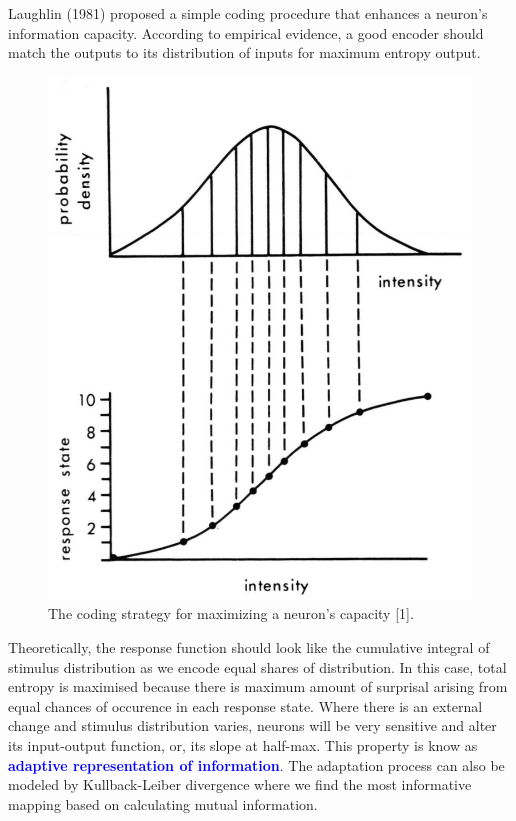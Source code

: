 \documentclass[11pt]{article}
\begin{document}
Laughlin (1981) proposed a simple coding procedure that enhances a neuron's information capacity. According to empirical evidence, a good encoder should match the outputs to its distribution of inputs for maximum entropy output.
\begin{figure}[H]
    \centering
    \includegraphics[scale=0.6]{imgs/efficientcoding.png}
    \caption{The coding strategy for maximizing a neuron's capacity [1].}
\end{figure}
Theoretically, the response function should look like the cumulative integral of stimulus distribution as we encode equal shares of distribution. In this case, total entropy is maximised because there is maximum amount of surprisal arising from equal chances of occurence in each response state. Where there is an external change and stimulus distribution varies, neurons will be very sensitive and alter its input-output function, or, its slope at half-max. This property is know as \textcolor{Blue}{\textbf{adaptive representation of information}}. The adaptation process can also be modeled by Kullback-Leiber divergence where we find the most informative mapping based on calculating mutual information.
\\
\end{document}
